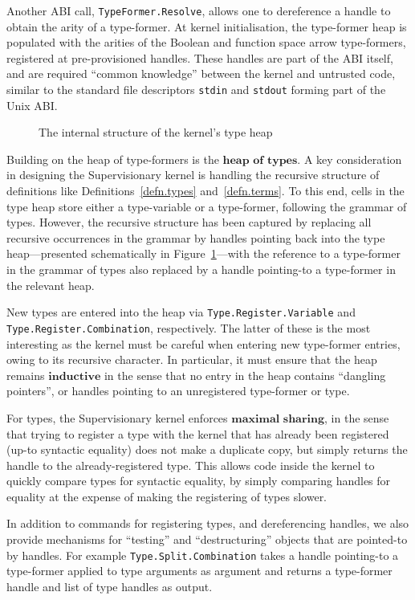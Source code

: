 \documentclass[a4paper, 10pt]{article}
\newcommand{\deffont}[1]{\ensuremath{\textbf{#1}}}
\begin{document}
Another ABI call, \texttt{TypeFormer.Resolve}, allows one to dereference a handle to obtain the arity of a type-former.
At kernel initialisation, the type-former heap is populated with the arities of the Boolean and function space arrow type-formers, registered at pre-provisioned handles.
These handles are part of the ABI itself, and are required ``common knowledge'' between the kernel and untrusted code, similar to the standard file descriptors \texttt{stdin} and \texttt{stdout} forming part of the Unix ABI.

\begin{figure}[t]
\caption{The internal structure of the kernel's type heap}
\label{fig.type.heap}
\end{figure}

Building on the heap of type-formers is the \deffont{heap of types}.
A key consideration in designing the Supervisionary kernel is handling the recursive structure of definitions like Definitions~\ref{defn.types} and~\ref{defn.terms}.
To this end, cells in the type heap store either a type-variable or a type-former, following the grammar of types.
However, the recursive structure has been captured by replacing all recursive occurrences in the grammar by handles pointing back into the type heap---presented schematically in Figure~\ref{fig.type.heap}---with the reference to a type-former in the grammar of types also replaced by a handle pointing-to a type-former in the relevant heap.

New types are entered into the heap via \texttt{Type.Register.Variable} and \texttt{Type.Register.Combination}, respectively.
The latter of these is the most interesting as the kernel must be careful when entering new type-former entries, owing to its recursive character.
In particular, it must ensure that the heap remains \deffont{inductive} in the sense that no entry in the heap contains ``dangling pointers'', or handles pointing to an unregistered type-former or type.

For types, the Supervisionary kernel enforces \deffont{maximal sharing}, in the sense that trying to register a type with the kernel that has already been registered (up-to syntactic equality) does not make a duplicate copy, but simply returns the handle to the already-registered type.
This allows code inside the kernel to quickly compare types for syntactic equality, by simply comparing handles for equality at the expense of making the registering of types slower.

In addition to commands for registering types, and dereferencing handles, we also provide mechanisms for ``testing'' and ``destructuring'' objects that are pointed-to by handles.
For example \texttt{Type.Split.Combination} takes a handle pointing-to a type-former applied to type arguments as argument and returns a type-former handle and list of type handles as output.
\end{document}
